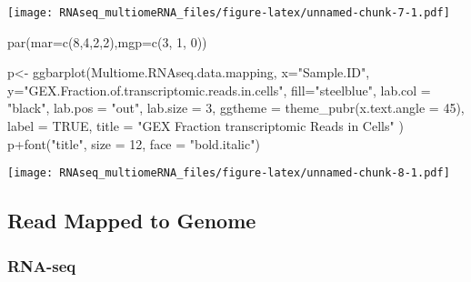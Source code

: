 \documentclass[
]{article}
\newenvironment{Shaded}{\begin{snugshade}}{\end{snugshade}}
\newcommand{\AttributeTok}[1]{\textcolor[rgb]{0.77,0.63,0.00}{#1}}
\newcommand{\ConstantTok}[1]{\textcolor[rgb]{0.00,0.00,0.00}{#1}}
\newcommand{\DecValTok}[1]{\textcolor[rgb]{0.00,0.00,0.81}{#1}}
\newcommand{\FunctionTok}[1]{\textcolor[rgb]{0.00,0.00,0.00}{#1}}
\newcommand{\NormalTok}[1]{#1}
\newcommand{\OtherTok}[1]{\textcolor[rgb]{0.56,0.35,0.01}{#1}}
\newcommand{\SpecialCharTok}[1]{\textcolor[rgb]{0.00,0.00,0.00}{#1}}
\newcommand{\StringTok}[1]{\textcolor[rgb]{0.31,0.60,0.02}{#1}}
\begin{document}
\texttt{[image: RNAseq\_multiomeRNA\_files/figure-latex/unnamed-chunk-7-1.pdf]}

\begin{Shaded}
\begin{Highlighting}[]
\FunctionTok{par}\NormalTok{(}\AttributeTok{mar=}\FunctionTok{c}\NormalTok{(}\DecValTok{8}\NormalTok{,}\DecValTok{4}\NormalTok{,}\DecValTok{2}\NormalTok{,}\DecValTok{2}\NormalTok{),}\AttributeTok{mgp=}\FunctionTok{c}\NormalTok{(}\DecValTok{3}\NormalTok{, }\DecValTok{1}\NormalTok{, }\DecValTok{0}\NormalTok{))}

\NormalTok{p}\OtherTok{\textless{}{-}} \FunctionTok{ggbarplot}\NormalTok{(Multiome.RNAseq.data.mapping, }
          \AttributeTok{x=}\StringTok{"Sample.ID"}\NormalTok{,}
          \AttributeTok{y=}\StringTok{"GEX.Fraction.of.transcriptomic.reads.in.cells"}\NormalTok{,}
          \AttributeTok{fill=}\StringTok{"steelblue"}\NormalTok{,}
          \AttributeTok{lab.col =} \StringTok{"black"}\NormalTok{, }
          \AttributeTok{lab.pos =} \StringTok{"out"}\NormalTok{,}
          \AttributeTok{lab.size =} \DecValTok{3}\NormalTok{,}
          \AttributeTok{ggtheme =} \FunctionTok{theme\_pubr}\NormalTok{(}\AttributeTok{x.text.angle =} \DecValTok{45}\NormalTok{),}
          \AttributeTok{label =} \ConstantTok{TRUE}\NormalTok{,}
          \AttributeTok{title =} \StringTok{"GEX Fraction transcriptomic Reads in Cells"}
\NormalTok{          )}
\NormalTok{p}\SpecialCharTok{+}\FunctionTok{font}\NormalTok{(}\StringTok{"title"}\NormalTok{, }\AttributeTok{size =} \DecValTok{12}\NormalTok{, }\AttributeTok{face =} \StringTok{"bold.italic"}\NormalTok{)}
\end{Highlighting}
\end{Shaded}

\texttt{[image: RNAseq\_multiomeRNA\_files/figure-latex/unnamed-chunk-8-1.pdf]}

\hypertarget{read-mapped-to-genome}{%
\subsection{Read Mapped to Genome}\label{read-mapped-to-genome}}

\hypertarget{rna-seq}{%
\subsubsection{RNA-seq}\label{rna-seq}}
\end{document}
